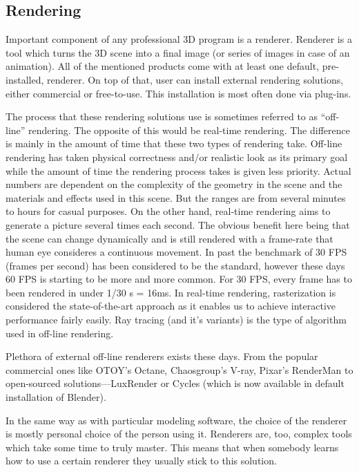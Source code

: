 \documentclass[
  digital, %
  table,   %
  nolof,     %
  nolot,     %
]{fithesis3}
\begin{document}
\subsection{Rendering}
Important component of any professional 3D program is a renderer. Renderer is a tool which turns the 3D scene into a final image (or series of images in case of an animation). All of the mentioned products come with at least one default, pre-installed, renderer. On top of that, user can install external rendering solutions, either commercial or free-to-use. This installation is most often done via plug-ins.

The process that these rendering solutions use is sometimes referred to as ``off-line'' rendering. The opposite of this would be real-time rendering. The difference is mainly in the amount of time that these two types of rendering take. Off-line rendering has taken physical correctness and/or realistic look as its primary goal while the amount of  time the rendering process takes is given less priority. Actual numbers are dependent on the complexity of the geometry in the scene and the materials and effects used in this scene. But the ranges are from several minutes to hours for casual purposes. On the other hand, real-time rendering aims to generate a picture several times each second. The obvious benefit here being that the scene can change dynamically and is still rendered with a frame-rate that human eye consideres a continuous movement. In past the benchmark of 30 FPS (frames per second) has been considered to be the standard, however these days 60 FPS is starting to be more and more common. For 30 FPS, every frame has to been rendered in under 1/30 s = 16ms. In real-time rendering, rasterization\cite{rasterization-paper} is considered the state-of-the-art approach as it enables us to achieve interactive performance fairly easily. Ray tracing (and it's variants) is the type of algorithm used in off-line rendering\cite{pbr-book}.

Plethora of external off-line renderers exists these days. From the popular commercial ones like OTOY's Octane, Chaosgroup's V-ray, Pixar's RenderMan to open-sourced solutions—LuxRender or Cycles (which is now available in default installation of Blender).

In the same way as with particular modeling software, the choice of the renderer is mostly personal choice of the person using it. Renderers are, too, complex tools  which take some time to truly master. This means that when somebody learns how to use a certain renderer they usually stick to this solution.
\end{document}

